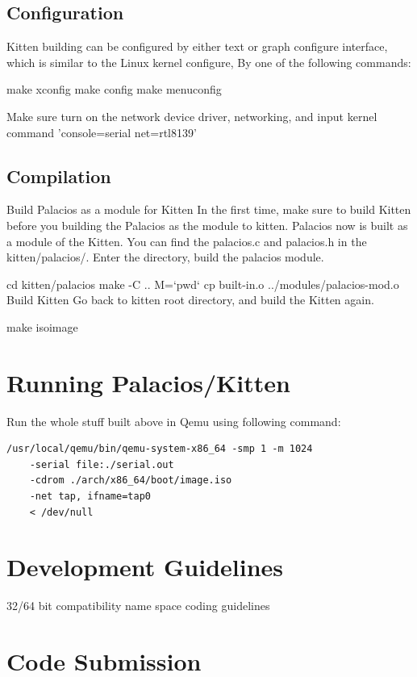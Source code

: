 \documentclass[11pt]{article}
\begin{document}
\subsection{Configuration}
Kitten building can be configured by either text or graph configure interface, which is similar to the Linux kernel configure, By one of the following commands:

make xconfig
make config
make menuconfig

Make sure turn on the network device driver, networking, and input kernel command 'console=serial net=rtl8139'
\subsection{Compilation}

Build Palacios as a module for Kitten
In the first time, make sure to build Kitten before you building the Palacios as the module to kitten. 
Palacios now is built as a module of the Kitten. You can find the palacios.c and palacios.h in the kitten/palacios/. Enter the directory, build the palacios module.

cd kitten/palacios
make -C .. M=`pwd`
cp built-in.o ../modules/palacios-mod.o
Build Kitten
Go back to kitten root directory, and build the Kitten again.

make  isoimage

\section{Running Palacios/Kitten}
Run the whole stuff built above in Qemu using following command: 

\begin{verbatim}
/usr/local/qemu/bin/qemu-system-x86_64 -smp 1 -m 1024 
	-serial file:./serial.out 
	-cdrom ./arch/x86_64/boot/image.iso  
	-net tap, ifname=tap0  
	< /dev/null
\end{verbatim}



\section{Development Guidelines}

32/64 bit compatibility
name space
coding guidelines


\section{Code Submission}
\label{sec:submission}
\end{document}
